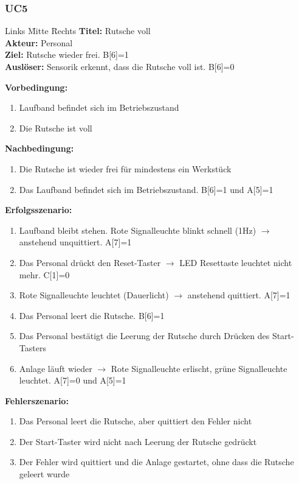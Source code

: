 \documentclass[oneside,a4paper,titlepage]{scrartcl} %
\begin{document}
\subsubsection{UC5}
\begin{tabbing}
 Links \= Mitte \= Rechts \kill
 \textbf{Titel:} \> \> Rutsche voll\\
 \textbf{Akteur:} \> \> Personal\\
 \textbf{Ziel:} \> \> Rutsche wieder frei. B[6]=1\\
 \textbf{Auslöser:} \> \> Sensorik erkennt, dass die Rutsche voll ist. B[6]=0\\
\end{tabbing}
\textbf{Vorbedingung:}
\begin{enumerate}
 \item Laufband befindet sich im Betriebszustand
 \item Die Rutsche ist voll
\end{enumerate}
\textbf{Nachbedingung:}
\begin{enumerate}
 \item Die Rutsche ist wieder frei für mindestens ein Werkstück
 \item Das Laufband befindet sich im Betriebszustand. B[6]=1 und A[5]=1
\end{enumerate}
\textbf{Erfolgsszenario:}
\begin{enumerate}
 \item Laufband bleibt stehen. Rote Signalleuchte blinkt schnell (1Hz) $\rightarrow$ anstehend unquittiert. A[7]=1
 \item Das Personal drückt den Reset-Taster $\rightarrow$ LED Resettaste leuchtet nicht mehr. C[1]=0
 \item Rote Signalleuchte leuchtet (Dauerlicht) $\rightarrow$ anstehend quittiert. A[7]=1
 \item Das Personal leert die Rutsche. B[6]=1
 \item Das Personal bestätigt die Leerung der Rutsche durch Drücken des Start-Tasters
 \item Anlage läuft wieder $\rightarrow$ Rote Signalleuchte erlischt, grüne Signalleuchte leuchtet. A[7]=0 und A[5]=1
\end{enumerate}
\textbf{Fehlerszenario:}
\begin{enumerate}
 \item Das Personal leert die Rutsche, aber quittiert den Fehler nicht
 \item Der Start-Taster wird nicht nach Leerung der Rutsche gedrückt
 \item Der Fehler wird quittiert und die Anlage gestartet, ohne dass die Rutsche geleert wurde
\end{enumerate}
\end{document}
